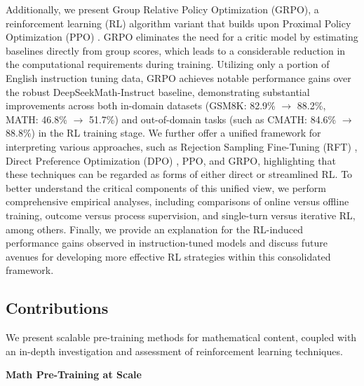 Additionally, we present Group Relative Policy Optimization (GRPO), a reinforcement learning (RL) algorithm variant that builds upon Proximal Policy Optimization (PPO) \citep{schulman2017proximal}. GRPO eliminates the need for a critic model by estimating baselines directly from group scores, which leads to a considerable reduction in the computational requirements during training. Utilizing only a portion of English instruction tuning data, GRPO achieves notable performance gains over the robust DeepSeekMath-Instruct baseline, demonstrating substantial improvements across both in-domain datasets (GSM8K: 82.9\% $\rightarrow$ 88.2\%, MATH: 46.8\% $\rightarrow$ 51.7\%) and out-of-domain tasks (such as CMATH: 84.6\% $\rightarrow$ 88.8\%) in the RL training stage. We further offer a unified framework for interpreting various approaches, such as Rejection Sampling Fine-Tuning (RFT) \citep{yuan2023scaling}, Direct Preference Optimization (DPO) \citep{dpo}, PPO, and GRPO, highlighting that these techniques can be regarded as forms of either direct or streamlined RL. To better understand the critical components of this unified view, we perform comprehensive empirical analyses, including comparisons of online versus offline training, outcome versus process supervision, and single-turn versus iterative RL, among others. Finally, we provide an explanation for the RL-induced performance gains observed in instruction-tuned models and discuss future avenues for developing more effective RL strategies within this consolidated framework.

\subsection{Contributions}
We present scalable pre-training methods for mathematical content, coupled with an in-depth investigation and assessment of reinforcement learning techniques.

\textbf{Math Pre-Training at Scale}

